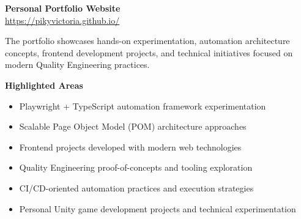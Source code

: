 \documentclass[11pt,a4paper]{article}
\begin{document}
\textbf{Personal Portfolio Website} \\
\href{https://pikyvictoria.github.io/}{https://pikyvictoria.github.io/}

\vspace{0.3cm}

The portfolio showcases hands-on experimentation, automation architecture concepts, frontend development projects, and technical initiatives focused on modern Quality Engineering practices.

\vspace{0.3cm}

\textbf{Highlighted Areas}

\begin{itemize}[leftmargin=*, itemsep=0.3em]

    \item Playwright + TypeScript automation framework experimentation
    
    \item Scalable Page Object Model (POM) architecture approaches
    
    \item Frontend projects developed with modern web technologies
    
    \item Quality Engineering proof-of-concepts and tooling exploration
    
    \item CI/CD-oriented automation practices and execution strategies
    
    \item Personal Unity game development projects and technical experimentation

\end{itemize}
\end{document}
